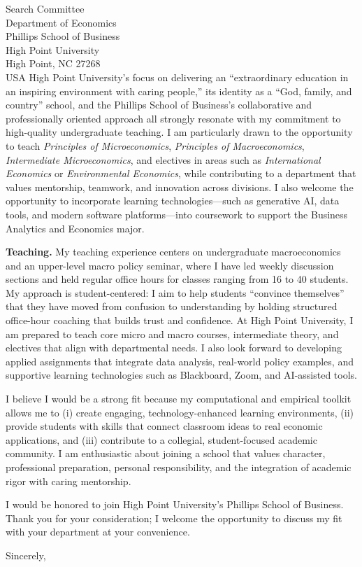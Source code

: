 \documentclass[11pt,letterpaper]{letter}
\begin{document}
\begin{letter}{Search Committee \\
Department of Economics \\
Phillips School of Business \\
High Point University \\
High Point, NC 27268 \\ USA}
High Point University’s focus on delivering an “extraordinary education in an inspiring environment with caring people,” its identity as a “God, family, and country” school, and the Phillips School of Business’s collaborative and professionally oriented approach all strongly resonate with my commitment to high-quality undergraduate teaching. I am particularly drawn to the opportunity to teach \textit{Principles of Microeconomics}, \textit{Principles of Macroeconomics}, \textit{Intermediate Microeconomics}, and electives in areas such as \textit{International Economics} or \textit{Environmental Economics}, while contributing to a department that values mentorship, teamwork, and innovation across divisions. I also welcome the opportunity to incorporate learning technologies—such as generative AI, data tools, and modern software platforms—into coursework to support the Business Analytics and Economics major.

\textbf{Teaching.} My teaching experience centers on undergraduate macroeconomics and an upper-level macro policy seminar, where I have led weekly discussion sections and held regular office hours for classes ranging from 16 to 40 students. My approach is student-centered: I aim to help students “convince themselves” that they have moved from confusion to understanding by holding structured office-hour coaching that builds trust and confidence. At High Point University, I am prepared to teach core micro and macro courses, intermediate theory, and electives that align with departmental needs. I also look forward to developing applied assignments that integrate data analysis, real-world policy examples, and supportive learning technologies such as Blackboard, Zoom, and AI-assisted tools.

I believe I would be a strong fit because my computational and empirical toolkit allows me to (i) create engaging, technology-enhanced learning environments, (ii) provide students with skills that connect classroom ideas to real economic applications, and (iii) contribute to a collegial, student-focused academic community. I am enthusiastic about joining a school that values character, professional preparation, personal responsibility, and the integration of academic rigor with caring mentorship.

I would be honored to join High Point University’s Phillips School of Business. Thank you for your consideration; I welcome the opportunity to discuss my fit with your department at your convenience.

\closing{Sincerely,}

\end{letter}
\end{document}
